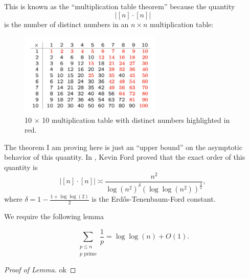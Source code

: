 \documentclass[12pt]{amsart}
\begin{document}
This is known as the ``multiplication table theorem'' because the quantity
\[
    \left\lvert [n] \cdot [n] \right\rvert 
\]
is the number of distinct numbers in an \(n \times n\) multiplication table:

\begin{figure}[h]
    \centering
    \includegraphics[width=0.6\textwidth]{mult-table.png}
    \caption{10 \(\times \) 10 multiplication table with distinct numbers highlighted in red.}
\end{figure}

The theorem I am proving here is just an ``upper bound'' on the asymptotic behavior of
this quantity. In \cite{Ford}, Kevin Ford proved that the exact order of this quantity is
\[
    \left\lvert [n] \cdot [n] \right\rvert \asymp \frac{n^{2}}{\log \left( n^{2} \right) ^{\delta} \left( \log \log \left( n^{2} \right) \right) ^{\frac{3}{2} } } 
,\]
where \(\delta = 1 - \frac{1 + \log \log \left( 2 \right)  }{2} \) is the Erd\H{o}s-Tenenbaum-Ford constant.

We require the following lemma
\begin{lemma*}
\[
    \sum _{\substack{ p \leq n \\ p\text{ prime}  }} \frac{1}{p}  = \log\log \left( n \right) + O(1)
.\]
\end{lemma*}

\begin{proof}[Proof of Lemma]
ok
\end{proof}
\end{document}

